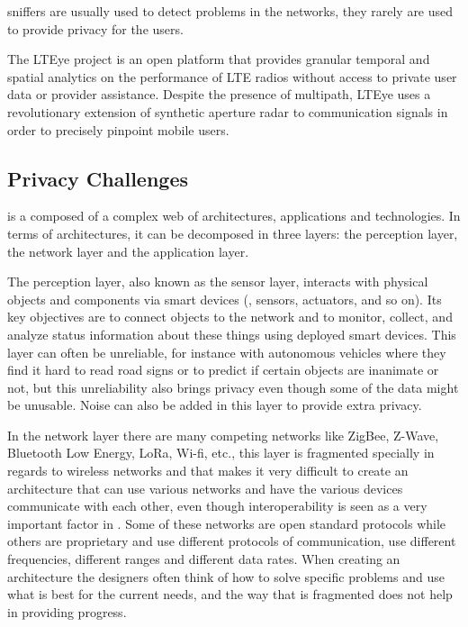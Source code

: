 \hyperlink{\acronym}{\acronym} sniffers are usually used to detect problems in the networks, they rarely
are used to provide privacy for the users.

The LTEye project \cite{KumarLTE} is an open platform that provides granular
temporal and spatial analytics on the performance of LTE radios without access
to private user data or provider assistance. Despite the presence of multipath,
LTEye uses a revolutionary extension of synthetic aperture radar to communication
signals in order to precisely pinpoint mobile users.

\subsection{Privacy Challenges}\label{subsubsection:privacy_challenges}

\hyperlink{\acronym}{\acronym} is a composed of a complex web of architectures, applications and technologies.
In terms of architectures, it can be decomposed in three layers: the perception
layer, the network layer and the application layer.

The perception layer, also known as the sensor layer, interacts with physical
objects and components via smart devices (\hyperlink{\acronym}{\acronym}, sensors, actuators, and
so on). Its key objectives are to connect objects to the \hyperlink{\acronym}{\acronym} network and
to monitor, collect, and analyze status information about these things using
deployed smart devices. This layer can often be unreliable, for instance
with autonomous vehicles where they find it hard to read road signs or to
predict if certain objects are inanimate or not, but this unreliability
also brings privacy even though some of the data might be unusable. Noise
can also be added in this layer to provide extra privacy.

In the network layer there are many competing networks like ZigBee, Z-Wave,
Bluetooth Low Energy, LoRa, Wi-fi, etc., this layer is fragmented specially
in regards to wireless networks and that makes it very difficult to create
an \hyperlink{\acronym}{\acronym} architecture that can use various networks and have the various
devices communicate with each other, even though interoperability is seen
as a very important factor in \hyperlink{\acronym}{\acronym}. Some of these networks are open standard
protocols while others are proprietary and use different protocols of communication,
use different frequencies, different ranges and different data rates. When
creating an \hyperlink{\acronym}{\acronym} architecture the designers often think of how to solve
specific problems and use what is best for the current needs, and the way
that \hyperlink{\acronym}{\acronym} is fragmented does not help in providing progress.

